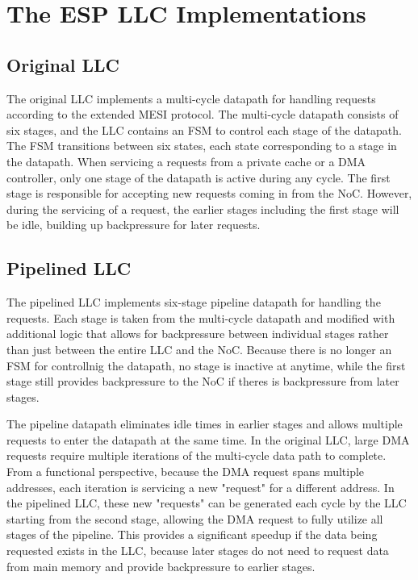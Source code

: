 \documentclass{sig-alternate}
\begin{document}
  
\section{The ESP LLC Implementations}
\label{sec:llcImplementations}
\subsection{Original LLC}
The original LLC implements a multi-cycle datapath for handling requests according to the extended MESI protocol. The multi-cycle datapath consists of six stages, and the LLC contains an FSM to control each stage of the datapath.
The FSM transitions between six states, each state corresponding to a stage in the datapath. 
When servicing a requests from a private cache or a DMA controller, only one stage of the datapath is active during any cycle. The first stage is responsible for accepting 
new requests coming in from the NoC. However, during the servicing of a request, the earlier stages including the first stage will be idle, building up backpressure for later requests.
\subsection{Pipelined LLC}
The pipelined LLC implements six-stage pipeline datapath for handling the requests. Each stage is taken from the multi-cycle datapath and modified with additional logic 
that allows for backpressure between individual stages rather than just between the entire LLC and the NoC. Because there is no longer an FSM for controllnig the datapath, 
no stage is inactive at anytime, while the first stage still provides backpressure to the NoC if theres is backpressure from later stages.
\par The pipeline datapath eliminates idle times in earlier stages and allows multiple requests to enter the datapath at the same time. 
In the original LLC, large DMA requests require multiple iterations of the multi-cycle data path to complete. From a functional perspective, because 
the DMA request spans multiple addresses, each iteration is servicing a new "request" for a different address. In the pipelined LLC, these new "requests" can be generated 
each cycle by the LLC starting from the second stage, allowing the DMA request to fully utilize all stages of the pipeline. This provides a significant speedup if the data 
being requested exists in the LLC, because later stages do not need to request data from main memory and provide backpressure to earlier stages.
\end{document}
